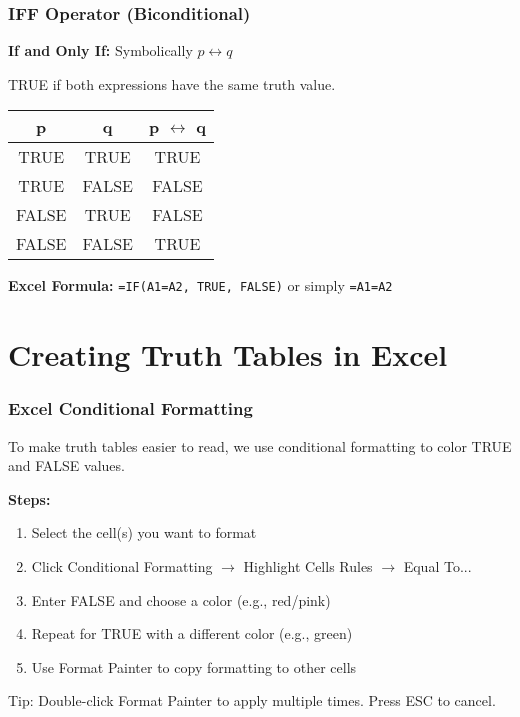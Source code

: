 \documentclass{beamer}
\begin{document}
\begin{frame}
\frametitle{IFF Operator (Biconditional)}
\textbf{If and Only If:} Symbolically $p \leftrightarrow q$\pause

TRUE if both expressions have the \alert{same} truth value.\pause

\vspace{0.3cm}
\begin{center}
\begin{tabular}{|c|c|c|}
\hline
\textbf{p} & \textbf{q} & \textbf{p $\leftrightarrow$ q} \\
\hline
TRUE & TRUE & TRUE \\
\hline
TRUE & FALSE & FALSE \\
\hline
FALSE & TRUE & FALSE \\
\hline
FALSE & FALSE & TRUE \\
\hline
\end{tabular}
\end{center}\pause

\vspace{0.3cm}
\textbf{Excel Formula:} \texttt{=IF(A1=A2, TRUE, FALSE)} or simply \texttt{=A1=A2}
\end{frame}

\section{Creating Truth Tables in Excel}

\begin{frame}
\frametitle{Excel Conditional Formatting}
To make truth tables easier to read, we use \alert{conditional formatting} to color TRUE and FALSE values.\pause

\vspace{0.3cm}
\textbf{Steps:}
\begin{enumerate}
    \item Select the cell(s) you want to format\pause
    \item Click Conditional Formatting $\rightarrow$ Highlight Cells Rules $\rightarrow$ Equal To...\pause
    \item Enter FALSE and choose a color (e.g., red/pink)\pause
    \item Repeat for TRUE with a different color (e.g., green)\pause
    \item Use Format Painter to copy formatting to other cells
\end{enumerate}\pause

\vspace{0.3cm}
\alert{Tip:} Double-click Format Painter to apply multiple times. Press ESC to cancel.
\end{frame}
\end{document}
